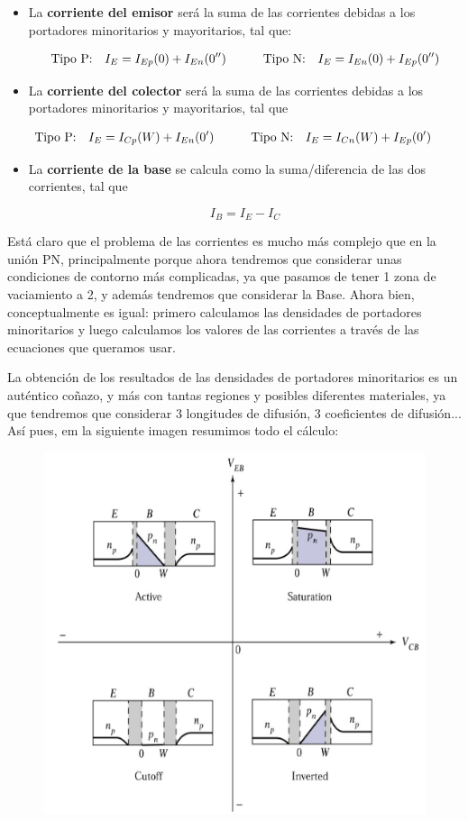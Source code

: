 \begin{itemize}
    \item La \textbf{corriente del emisor} será la suma de las corrientes debidas a los portadores minoritarios y mayoritarios, tal que:
    
    \begin{equation}
       \text{Tipo P:} \quad I_E = I_{Ep}(0) + I_{En} (0'') \quad \quad \quad 
       \text{Tipo N:} \quad I_E = I_{En}(0) + I_{Ep} (0'')
    \end{equation}

    \item La \textbf{corriente del colector} será la suma de las corrientes debidas a los portadores minoritarios y mayoritarios, tal que
    
    \begin{equation}
        \text{Tipo P:} \quad I_E = I_{Cp}(W) + I_{En} (0') \quad \quad \quad 
        \text{Tipo N:} \quad I_E = I_{Cn}(W) + I_{Ep} (0') \quad \quad \quad 
    \end{equation}

    \item La \textbf{corriente de la base} se calcula  como la suma/diferencia de las dos corrientes, tal que
    
    \begin{equation}
        I_B = I_E - I_C
    \end{equation}
\end{itemize}
Está claro que el problema de las corrientes es mucho más complejo que en la unión PN, principalmente porque ahora tendremos que considerar unas condiciones de contorno más complicadas, ya que pasamos de tener 1 zona de vaciamiento a 2, y además tendremos que considerar la Base. Ahora bien, conceptualmente es igual: primero calculamos las densidades de portadores minoritarios y luego calculamos los valores de las corrientes a través de las ecuaciones que queramos usar. 

La obtención de los resultados de las densidades de portadores minoritarios es un auténtico coñazo, y más con tantas regiones y posibles diferentes materiales, ya que tendremos que considerar 3 longitudes de difusión, 3 coeficientes de difusión... Así pues, em la siguiente imagen resumimos todo el cálculo: 

\begin{figure}[H] \centering
    \includegraphics[width=0.6\linewidth]{Cuerpo/Ch_04/Fig-03.png}
\end{figure}

